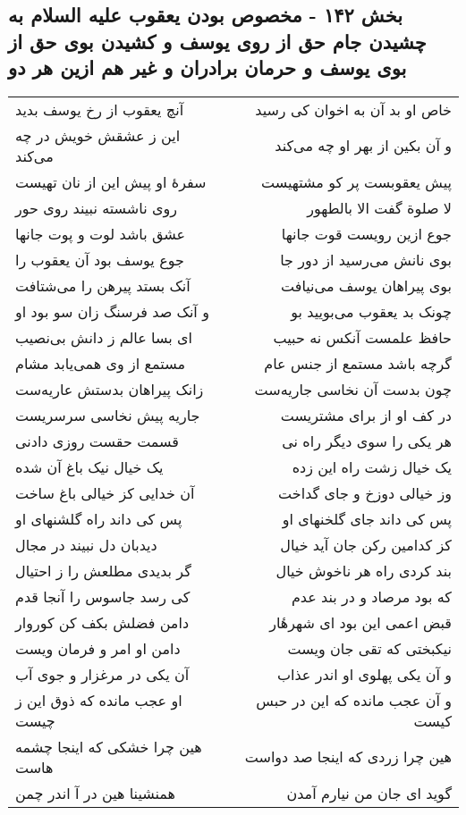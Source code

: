 \begin{center}
\section*{بخش ۱۴۲ - مخصوص بودن یعقوب علیه السلام به چشیدن جام حق از روی یوسف و کشیدن بوی حق از بوی یوسف و حرمان برادران و غیر هم ازین هر دو}
\label{sec:sh142}
\begin{longtable}{l p{0.5cm} r}
آنچ یعقوب از رخ یوسف بدید
&&
خاص او بد آن به اخوان کی رسید
\\
این ز عشقش خویش در چه می‌کند
&&
و آن بکین از بهر او چه می‌کند
\\
سفرهٔ او پیش این از نان تهیست
&&
پیش یعقوبست پر کو مشتهیست
\\
روی ناشسته نبیند روی حور
&&
لا صلوة گفت الا بالطهور
\\
عشق باشد لوت و پوت جانها
&&
جوع ازین رویست قوت جانها
\\
جوع یوسف بود آن یعقوب را
&&
بوی نانش می‌رسید از دور جا
\\
آنک بستد پیرهن را می‌شتافت
&&
بوی پیراهان یوسف می‌نیافت
\\
و آنک صد فرسنگ زان سو بود او
&&
چونک بد یعقوب می‌بویید بو
\\
ای بسا عالم ز دانش بی‌نصیب
&&
حافظ علمست آنکس نه حبیب
\\
مستمع از وی همی‌یابد مشام
&&
گرچه باشد مستمع از جنس عام
\\
زانک پیراهان بدستش عاریه‌ست
&&
چون بدست آن نخاسی جاریه‌ست
\\
جاریه پیش نخاسی سرسریست
&&
در کف او از برای مشتریست
\\
قسمت حقست روزی دادنی
&&
هر یکی را سوی دیگر راه نی
\\
یک خیال نیک باغ آن شده
&&
یک خیال زشت راه این زده
\\
آن خدایی کز خیالی باغ ساخت
&&
وز خیالی دوزخ و جای گداخت
\\
پس کی داند راه گلشنهای او
&&
پس کی داند جای گلخنهای او
\\
دیدبان دل نبیند در مجال
&&
کز کدامین رکن جان آید خیال
\\
گر بدیدی مطلعش را ز احتیال
&&
بند کردی راه هر ناخوش خیال
\\
کی رسد جاسوس را آنجا قدم
&&
که بود مرصاد و در بند عدم
\\
دامن فضلش بکف کن کوروار
&&
قبض اعمی این بود ای شهرهٔار
\\
دامن او امر و فرمان ویست
&&
نیکبختی که تقی جان ویست
\\
آن یکی در مرغزار و جوی آب
&&
و آن یکی پهلوی او اندر عذاب
\\
او عجب مانده که ذوق این ز چیست
&&
و آن عجب مانده که این در حبس کیست
\\
هین چرا خشکی که اینجا چشمه هاست
&&
هین چرا زردی که اینجا صد دواست
\\
همنشینا هین در آ اندر چمن
&&
گوید ای جان من نیارم آمدن
\\
\end{longtable}
\end{center}
